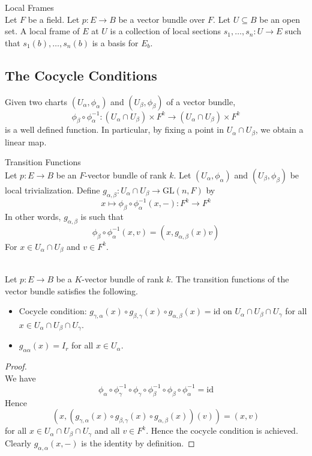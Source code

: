 \documentclass[a4paper]{article}
\begin{document}
\begin{defn}{Local Frames}{}\\
Let $F$ be a field. Let $p:E\to B$ be a vector bundle over $F$. Let $U\subseteq B$ be an open set. A local frame of $E$ at $U$ is a collection of local sections $s_1,\dots,s_n:U\to E$ such that $s_1(b),\dots,s_n(b)$ is a basis for $E_b$. 
\end{defn}

\subsection{The Cocycle Conditions}
Given two charts $(U_\alpha,\phi_\alpha)$ and $(U_\beta,\phi_\beta)$ of a vector bundle, $$\phi_\beta\circ\phi_\alpha^{-1}:(U_\alpha\cap U_\beta)\times F^k\to(U_\alpha\cap U_\beta)\times F^k$$ is a well defined function. In particular, by fixing a point in $U_\alpha\cap U_\beta$, we obtain a linear map. 

\begin{defn}{Transition Functions}{}\\
Let $p:E\to B$ be an $F$-vector bundle of rank $k$. Let $(U_\alpha,\phi_\alpha)$ and $(U_\beta,\phi_\beta)$ be local trivialization. Define $g_{\alpha,\beta}:U_\alpha\cap U_\beta\to\text{GL}(n,F)$ by $$x\mapsto\phi_\beta\circ\phi_\alpha^{-1}(x,-):F^k\to F^k$$ In other words, $g_{\alpha,\beta}$ is such that $$\phi_\beta\circ\phi_\alpha^{-1}(x,v)=(x,g_{\alpha,\beta}(x)v)$$ For $x\in U_\alpha\cap U_\beta$ and $v\in F^k$. 
\end{defn}

\begin{prp}{}{}\\
Let $p:E\to B$ be a $K$-vector bundle of rank $k$. The transition functions of the vector bundle satisfies the following. 
\begin{itemize}
\item Cocycle condition: $g_{\gamma,\alpha}(x)\circ g_{\beta,\gamma}(x)\circ g_{\alpha,\beta}(x)=\text{id}$ on $U_\alpha\cap U_\beta\cap U_\gamma$ for all $x\in U_\alpha\cap U_\beta\cap U_\gamma$. 
\item $g_{\alpha\alpha}(x)=I_r$ for all $x\in U_\alpha$. 
\end{itemize}
\begin{proof}\\
We have $$\phi_\alpha\circ\phi_\gamma^{-1}\circ\phi_\gamma\circ\phi_\beta^{-1}\circ\phi_\beta\circ\phi_\alpha^{-1}=\text{id}$$ Hence $$(x,(g_{\gamma,\alpha}(x)\circ g_{\beta,\gamma}(x)\circ g_{\alpha,\beta}(x))(v))=(x,v)$$ for all $x\in U_\alpha\cap U_\beta\cap U_\gamma$ and all $v\in F^k$. Hence the cocycle condition is achieved. \\

Clearly $g_{\alpha,\alpha}(x,-)$ is the identity by definition. 
\end{proof}
\end{prp}
\end{document}
